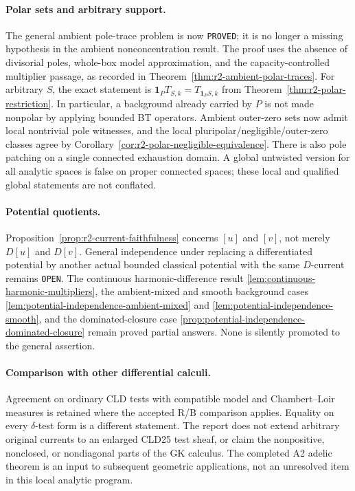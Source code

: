 \paragraph{Polar sets and arbitrary support.}
The general ambient pole-trace problem is now \texttt{PROVED}; it is
no longer a missing hypothesis in the ambient nonconcentration result.
The proof uses the absence of divisorial poles, whole-box model
approximation, and the capacity-controlled multiplier passage, as
recorded in Theorem~\ref{thm:r2-ambient-polar-traces}. For arbitrary
$S$, the exact statement is
$\mathbf1_P T_{S,k}=T_{\mathbf1_PS,k}$ from
Theorem~\ref{thm:r2-polar-restriction}. In particular, a background
already carried by $P$ is not made nonpolar by applying bounded BT
operators. Ambient outer-zero sets now admit local nontrivial pole
witnesses, and the local pluripolar/negligible/outer-zero classes agree
by Corollary~\ref{cor:r2-polar-negligible-equivalence}. There is also
pole patching on a single connected exhaustion domain. A global
untwisted version for all analytic spaces is false on proper connected
spaces; these local and qualified global statements are not conflated.

\paragraph{Potential quotients.}
Proposition~\ref{prop:r2-current-faithfulness} concerns $[u]$ and
$[v]$, not merely $D[u]$ and $D[v]$. General independence under
replacing a differentiated potential by another actual bounded
classical potential with the same $D$-current remains \texttt{OPEN}.
The continuous harmonic-difference result
\ref{lem:continuous-harmonic-multipliers}, the ambient-mixed and smooth
background cases \ref{lem:potential-independence-ambient-mixed} and
\ref{lem:potential-independence-smooth}, and the dominated-closure
case \ref{prop:potential-independence-dominated-closure} remain proved
partial answers. None is silently promoted to the general assertion.

\paragraph{Comparison with other differential calculi.}
Agreement on ordinary CLD tests with compatible model and
Chambert--Loir measures is retained where the accepted R/B comparison
applies. Equality on every $\delta$-test form is a different statement.
The report does not extend arbitrary original currents to an enlarged
CLD25 test sheaf, or claim the nonpositive, nonclosed, or nondiagonal
parts of the GK calculus. The completed A2 adelic theorem is an input
to subsequent geometric applications, not an unresolved item in this
local analytic program.

